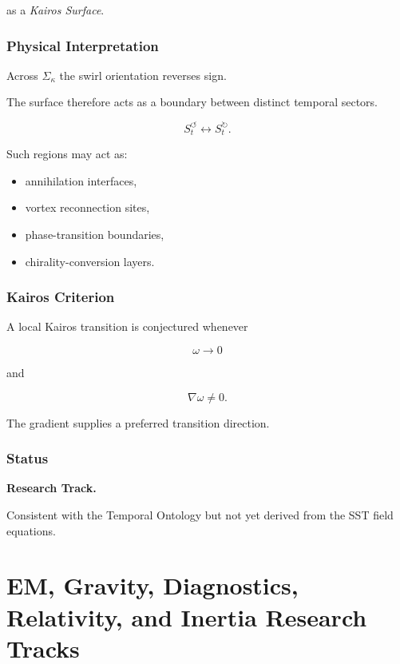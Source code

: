         as a \emph{Kairos Surface}.
    
    \subsubsection{Physical Interpretation}
        
        Across $\Sigma_\kappa$ the swirl orientation reverses sign.
        
        The surface therefore acts as a boundary between distinct temporal sectors.
        
        \[
            S_t^{\circlearrowleft}
            \longleftrightarrow
            S_t^{\circlearrowright}.
        \]
        
        Such regions may act as:
        
        \begin{itemize}
            \item annihilation interfaces,
            \item vortex reconnection sites,
            \item phase-transition boundaries,
            \item chirality-conversion layers.
        \end{itemize}
    
    \subsubsection{Kairos Criterion}
        
        A local Kairos transition is conjectured whenever
        
        \[
            \omega
            \rightarrow
            0
        \]
        
        and
        
        \[
            \nabla\omega
            \neq
            0.
        \]
        
        The gradient supplies a preferred transition direction.
    
    \subsubsection{Status}
        
        \textbf{Research Track.}
        
        Consistent with the Temporal Ontology but not yet derived from the SST field
        equations.

\section{EM, Gravity, Diagnostics, Relativity, and Inertia Research Tracks}

